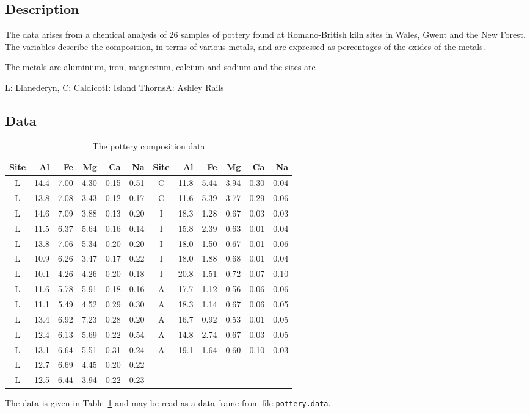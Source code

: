 \documentclass{article}
\newcommand{\strutt}{\vrule height 2.5ex depth 0.5ex width 0ex}%
\newcommand{\code}[1]{\texttt{#1}}
\begin{document}
\subsection*{Description}
    The data arises from a chemical analysis of 26 samples of pottery found
    at Romano-British kiln sites in Wales, Gwent and the New Forest.  The
    variables describe the composition, in terms of various metals, and are
    expressed as percentages of the oxides of the metals.

    The metals are aluminium, iron, magnesium, calcium and sodium and the
    sites are
\begin{center}
L: Llanederyn, \quad C: Caldicot\quad  I: Island Thorns\quad A: Ashley Rails
\end{center}

\subsection*{Data}

\begin{table}[ht]
\begin{center}
\begin{tabular}{@{\protect\strutt}|*{2}{c|rrrrr|}}
\hline
 Site & Al & Fe & Mg & Ca & Na & Site & Al & Fe & Mg & Ca & Na\\
\hline
 L & 14.4 & 7.00 & 4.30 & 0.15 & 0.51 & C & 11.8 & 5.44 & 3.94 & 0.30 & 0.04\\
 L & 13.8 & 7.08 & 3.43 & 0.12 & 0.17 & C & 11.6 & 5.39 & 3.77 & 0.29 & 0.06\\
 L & 14.6 & 7.09 & 3.88 & 0.13 & 0.20 & I & 18.3 & 1.28 & 0.67 & 0.03 & 0.03\\
 L & 11.5 & 6.37 & 5.64 & 0.16 & 0.14 & I & 15.8 & 2.39 & 0.63 & 0.01 & 0.04\\
 L & 13.8 & 7.06 & 5.34 & 0.20 & 0.20 & I & 18.0 & 1.50 & 0.67 & 0.01 & 0.06\\
 L & 10.9 & 6.26 & 3.47 & 0.17 & 0.22 & I & 18.0 & 1.88 & 0.68 & 0.01 & 0.04\\
 L & 10.1 & 4.26 & 4.26 & 0.20 & 0.18 & I & 20.8 & 1.51 & 0.72 & 0.07 & 0.10\\
 L & 11.6 & 5.78 & 5.91 & 0.18 & 0.16 & A & 17.7 & 1.12 & 0.56 & 0.06 & 0.06\\
 L & 11.1 & 5.49 & 4.52 & 0.29 & 0.30 & A & 18.3 & 1.14 & 0.67 & 0.06 & 0.05\\
 L & 13.4 & 6.92 & 7.23 & 0.28 & 0.20 & A & 16.7 & 0.92 & 0.53 & 0.01 & 0.05\\
 L & 12.4 & 6.13 & 5.69 & 0.22 & 0.54 & A & 14.8 & 2.74 & 0.67 & 0.03 & 0.05\\
 L & 13.1 & 6.64 & 5.51 & 0.31 & 0.24 & A & 19.1 & 1.64 & 0.60 & 0.10 & 0.03\\
 L & 12.7 & 6.69 & 4.45 & 0.20 & 0.22&&&&&&\\
         L  &     12.5  &     6.44  &    3.94 &     0.22 &   0.23&&&&&&\\
\hline
\end{tabular}
\end{center}
\caption{\label{pottery} The pottery composition data}
\end{table}
The data is given in Table~\ref{pottery} and may be read as a data frame from
file \code{pottery.data}.
\end{document}
